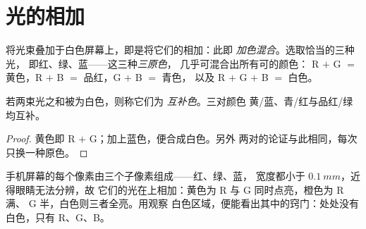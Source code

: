 \section{光的相加}

\begin{definition}[加色混合]\label{def:g11:color-light-sources:additive}
将光束叠加于白色屏幕上，即是将它们的相加：此即
\emph{加色混合}。选取恰当的三种光，
即红、绿、蓝——这三种\emph{三原色}，
几乎可混合出所有可的颜色：
R $+$ G $=$ 黄色，R $+$ B $=$ 品红，G $+$ B $=$ 青色，
以及 R $+$ G $+$ B $=$ 白色。
\end{definition}

\begin{proposition}[互补色]\label{prop:g11:color-light-sources:complementary}
若两束光之和被为白色，则称它们为
\emph{互补色}。三对颜色
黄/蓝、青/红与品红/绿均互补。
\end{proposition}

\begin{proof}
黄色即 R $+$ G；加上蓝色，便合成白色。另外
两对的论证与此相同，每次只换一种原色。
\end{proof}

\begin{example}[屏幕]\label{ex:g11:color-light-sources:screen}
手机屏幕的每个像素由三个子像素组成——红、绿、蓝，
宽度都小于 $\qty{0.1}{mm}$，近得眼睛无法分辨，故
它们的光在上相加：黄色为 R 与 G 同时点亮，橙色为 R 满、
G 半，白色则三者全亮。用观察
白色区域，便能看出其中的窍门：处处没有白色，只有 R、G、B。
\end{example}

